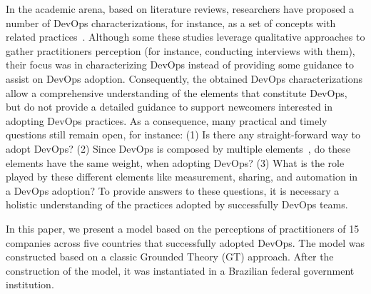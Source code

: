 In the academic arena, based on literature reviews, researchers have proposed a
number of DevOps characterizations, for instance, as a set of concepts with
related
practices~\cite{cooperation_dev_ops_esem_2014,devops_a_definition_xp_15,dimensions_of_devops_xp_15,extending_dimensions_icsea_16,characterizing_devops_sbes_2016,qualitative_devops_journalsw_17}. Although some these studies leverage
qualitative approaches to gather practitioners perception (for instance,
conducting interviews with them), their focus was in characterizing DevOps
instead of providing some guidance to assist on DevOps adoption. Consequently,
the obtained DevOps characterizations allow a comprehensive understanding of
the elements that constitute DevOps, but do not provide a detailed guidance to
support newcomers interested in adopting DevOps practices.
As a consequence, many practical and timely questions still remain open, for
instance: (1) Is there any straight-forward way to adopt DevOps? (2) Since
DevOps is composed by multiple elements~\cite{dimensions_of_devops_xp_15}, do
these elements have the same weight, when adopting DevOps?
(3) What is the role played by these different elements like measurement, sharing, and automation in a DevOps adoption? To provide answers to these questions, it is necessary a holistic understanding of the practices adopted by successfully DevOps teams.

In this paper, we present a model based on the perceptions of practitioners of
15 companies across five countries that successfully adopted DevOps. The model
was constructed based on a classic Grounded Theory (GT) approach. After the
construction of the model, it was instantiated in a Brazilian federal
government institution. 




